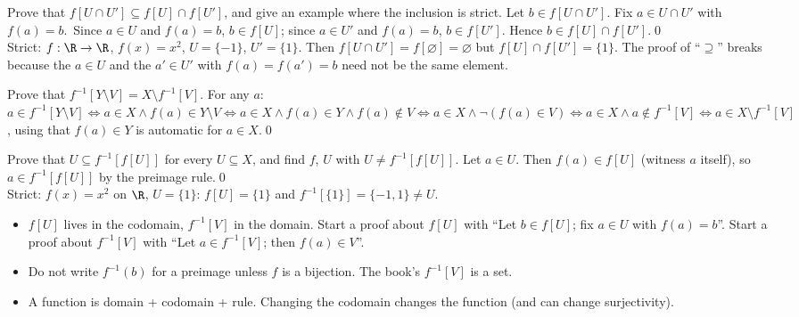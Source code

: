\begin{hexample}\label{ex:imgcap}
Prove that $f[U\cap U']\subseteq f[U]\cap f[U']$, and give an example where the inclusion is strict.
\solution
Let $b\in f[U\cap U']$. Fix $a\in U\cap U'$ with $f(a)=b$.\ Since $a\in U$ and $f(a)=b$, $b\in f[U]$; since $a\in U'$ and $f(a)=b$, $b\in f[U']$. Hence $b\in f[U]\cap f[U']$.\qed\\
Strict: $f:\R\to\R$, $f(x)=x^2$, $U=\{-1\}$, $U'=\{1\}$. Then $f[U\cap U']=f[\varnothing]=\varnothing$ but $f[U]\cap f[U']=\{1\}$. The proof of ``$\supseteq$'' breaks because the $a\in U$ and the $a'\in U'$ with $f(a)=f(a')=b$ need not be the same element.
\end{hexample}

\begin{hexample}
Prove that $f^{-1}[Y\setminus V]=X\setminus f^{-1}[V]$.
\solution
For any $a$: \ $a\in f^{-1}[Y\setminus V]\Leftrightarrow a\in X\wedge f(a)\in Y\setminus V\Leftrightarrow a\in X\wedge f(a)\in Y\wedge f(a)\notin V\Leftrightarrow a\in X\wedge\neg(f(a)\in V)\Leftrightarrow a\in X\wedge a\notin f^{-1}[V]\Leftrightarrow a\in X\setminus f^{-1}[V]$, using that $f(a)\in Y$ is automatic for $a\in X$.\qed
\end{hexample}

\begin{hexample}\label{ex:preimg}
Prove that $U\subseteq f^{-1}[f[U]]$ for every $U\subseteq X$, and find $f$, $U$ with $U\neq f^{-1}[f[U]]$.
\solution
Let $a\in U$. Then $f(a)\in f[U]$ (witness $a$ itself), so $a\in f^{-1}[f[U]]$ by the preimage rule.\qed\\
Strict: $f(x)=x^2$ on $\R$, $U=\{1\}$: $f[U]=\{1\}$ and $f^{-1}[\{1\}]=\{-1,1\}\neq U$.
\end{hexample}

\begin{warn}
\begin{itemize}
\item $f[U]$ lives in the codomain, $f^{-1}[V]$ in the domain. Start a proof about $f[U]$ with ``Let $b\in f[U]$; fix $a\in U$ with $f(a)=b$''. Start a proof about $f^{-1}[V]$ with ``Let $a\in f^{-1}[V]$; then $f(a)\in V$''.
\item Do not write $f^{-1}(b)$ for a preimage unless $f$ is a bijection. The book's $f^{-1}[V]$ is a set.
\item A function is domain + codomain + rule. Changing the codomain changes the function (and can change surjectivity).
\end{itemize}
\end{warn}

